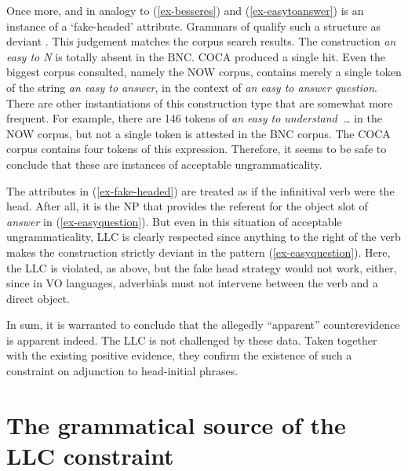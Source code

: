 \documentclass[output=paper
  ,nobabel
  ,uniformtopskip %
]{langscibook}
\begin{document}
\noindent
Once more, and in analogy to (\ref{ex-besseres}) and (\ref{ex-easytoanswer}) is an instance of a `fake-headed' attribute. Grammars of  qualify such a structure as deviant \citep[551]{HuddlestonPullum2002}. This judgement matches the corpus search results. The construction \emph{an easy to N} is totally absent in the BNC. COCA produced a single hit. Even the biggest corpus consulted, namely the NOW corpus, contains merely a single token of the string \emph{an easy to answer}, in the context of \emph{an easy to answer question}. There are other instantiations of this construction type that are somewhat more frequent. For example, there are 146 tokens of \emph{an easy to understand~\ldots} in the NOW corpus, but not a single token is attested in the BNC corpus. The COCA corpus contains four tokens of this expression. Therefore, it seems to be safe to conclude that these are instances of acceptable ungrammaticality.

The attributes in (\ref{ex-fake-headed}) are treated as if the infinitival verb were the head. After all, it is the NP that provides the referent for the object slot of \emph{answer} in (\ref{ex-easyquestion}). But even in this situation of acceptable ungrammaticality, LLC is clearly respected since anything to the right of the verb makes the construction strictly deviant in the pattern (\ref{ex-easyquestion}). Here, the LLC is violated, as above, but the fake head strategy would not work, either, since in VO languages, adverbials must not intervene between the verb and a direct object.

\eal
{}\label{ex-easyquestion}
\zl

\noindent
In sum, it is warranted to conclude that the allegedly ``apparent'' counterevidence is apparent indeed. The LLC is not challenged by these data. Taken together with the existing positive evidence, they confirm the existence of such a constraint on adjunction to head-initial phrases.

\section{The grammatical source of the LLC constraint}\label{sec-llcconstraint}
\end{document}
